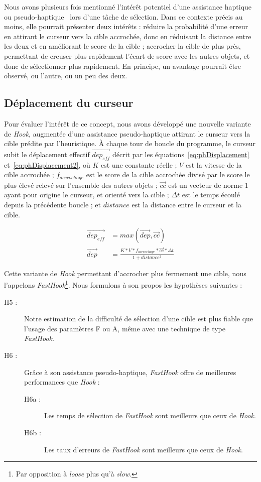 	Nous avons plusieurs fois mentionné l'intérêt potentiel d'une assistance haptique ou pseudo-haptique~\cite{lecuyer2009simulating, pusch2011pseudo} lors d'une tâche de sélection. Dans ce contexte précis au moins, elle pourrait présenter deux intérêts : réduire la probabilité d'une erreur en attirant le curseur vers la cible accrochée, donc en réduisant la distance entre les deux et en améliorant le score de la cible ; accrocher la cible de plus près, permettant de creuser plus rapidement l'écart de score avec les autres objets, et donc de sélectionner plus rapidement. En principe, un avantage pourrait être observé, ou l'autre, ou un peu des deux.
	
	\subsection{Déplacement du curseur}
	Pour évaluer l'intérêt de ce concept, nous avons développé une nouvelle variante de \emph{Hook}, augmentée d'une assistance pseudo-haptique attirant le curseur vers la cible prédite par l'heuristique. À chaque tour de boucle du programme, le curseur subit le déplacement effectif $\vec{dep_{eff}}$ décrit par les équations~\ref{eq:phDisplacement} et~\ref{eq:phDisplacement2}, où $K$ est une constante réelle ; $V$ est la vitesse de la cible accrochée ; $f_{accrochage}$ est le score de la cible accrochée divisé par le score le plus élevé relevé sur l'ensemble des autres objets ; $\vec{cc}$ est un vecteur de norme 1 ayant pour origine le curseur, et orienté vers la cible ; $\Delta{}t$ est le temps écoulé depuis la précédente boucle ; et $distance$ est la distance entre le curseur et la cible.

	\begin{align}
		\label{eq:phDisplacement}
		\vec{dep_{eff}} &= max(\vec{dep}, \vec{cc}) \\
		\label{eq:phDisplacement2}
		\vec{dep} &= \frac{K * V * f_{accrochage} * \vec{cc} * \Delta{}t}{1 + distance^{2}}
	\end{align}
	
	Cette variante de \emph{Hook} permettant d'accrocher plus fermement une cible, nous l'appelons \emph{FastHook}\footnote{Par opposition à \emph{loose} plus qu'à \emph{slow}.}. Nous formulons à son propos les hypothèses suivantes :
	
	\begin{description}
		\item[H5 :] Notre estimation de la difficulté de sélection d'une cible est plus fiable que l'usage des paramètres F ou A, même avec une technique de type \emph{FastHook}.
		\item[H6 :] Grâce à son assistance pseudo-haptique, \emph{FastHook} offre de meilleures performances que \emph{Hook} :
		\begin{description}
			\item[H6a :] Les temps de sélection de \emph{FastHook} sont meilleurs que ceux de \emph{Hook}.
			\item[H6b :] Les taux d'erreurs de \emph{FastHook} sont meilleurs que ceux de \emph{Hook}.
		\end{description}
	\end{description}
	
